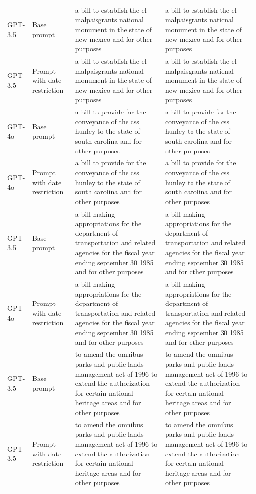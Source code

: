 \begin{longtable}{>{\raggedright\arraybackslash}p{1.4cm}>{\raggedright\arraybackslash}p{1.4cm}>{\raggedright\arraybackslash}p{5.5cm}>{\raggedright\arraybackslash}p{5.5cm}}
GPT-3.5 & Base prompt & a bill to establish the el malpaisgrants national monument in the state of new mexico and for other purposes & a bill to establish the el malpaisgrants national monument in the state of new mexico and for other purposes\\
GPT-3.5 & Prompt with date restriction & a bill to establish the el malpaisgrants national monument in the state of new mexico and for other purposes & a bill to establish the el malpaisgrants national monument in the state of new mexico and for other purposes\\
GPT-4o & Base prompt & a bill to provide for the conveyance of the css hunley to the state of south carolina and for other purposes & a bill to provide for the conveyance of the css hunley to the state of south carolina and for other purposes\\
GPT-4o & Prompt with date restriction & a bill to provide for the conveyance of the css hunley to the state of south carolina and for other purposes & a bill to provide for the conveyance of the css hunley to the state of south carolina and for other purposes\\
GPT-3.5 & Base prompt & a bill making appropriations for the department of transportation and related agencies for the fiscal year ending september 30 1985 and for other purposes & a bill making appropriations for the department of transportation and related agencies for the fiscal year ending september 30 1985 and for other purposes\\
GPT-4o & Prompt with date restriction & a bill making appropriations for the department of transportation and related agencies for the fiscal year ending september 30 1985 and for other purposes & a bill making appropriations for the department of transportation and related agencies for the fiscal year ending september 30 1985 and for other purposes\\
GPT-3.5 & Base prompt & to amend the omnibus parks and public lands management act of 1996 to extend the authorization for certain national heritage areas and for other purposes & to amend the omnibus parks and public lands management act of 1996 to extend the authorization for certain national heritage areas and for other purposes\\
GPT-3.5 & Prompt with date restriction & to amend the omnibus parks and public lands management act of 1996 to extend the authorization for certain national heritage areas and for other purposes & to amend the omnibus parks and public lands management act of 1996 to extend the authorization for certain national heritage areas and for other purposes\\

\end{longtable}
